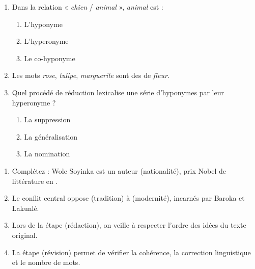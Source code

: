 \documentclass[11pt]{article}
\begin{document}
\begin{exercice}
\begin{enumerate}
    \item Dans la relation « \textit{chien} / \textit{animal} », \textit{animal} est :
    \begin{enumerate}
        \item L'hyponyme
        \item L'hyperonyme
        \item Le co-hyponyme
    \end{enumerate}
    \item Les mots \textit{rose}, \textit{tulipe}, \textit{marguerite} sont des \underline{\hspace{3cm}} de \textit{fleur}.
    \item Quel procédé de réduction lexicalise une série d'hyponymes par leur hyperonyme ?
    \begin{enumerate}
        \item La suppression
        \item La généralisation
        \item La nomination
    \end{enumerate}
\end{enumerate}
\end{exercice}

\begin{exercice}
\begin{enumerate}
    \item Complétez : Wole Soyinka est un auteur \underline{\hspace{2cm}} (nationalité), prix Nobel de littérature en \underline{\hspace{1,5cm}}.
    \item Le conflit central oppose \underline{\hspace{2cm}} (tradition) à \underline{\hspace{2cm}} (modernité), incarnés par Baroka et Lakunlé.
    \item Lors de la \underline{\hspace{2cm}} étape (rédaction), on veille à respecter l'ordre des idées du texte original.
    \item La \underline{\hspace{2cm}} étape (révision) permet de vérifier la cohérence, la correction linguistique et le nombre de mots.
\end{enumerate}
\end{exercice}
\end{document}
